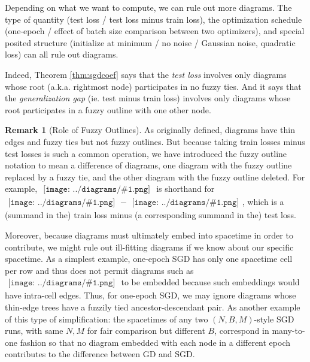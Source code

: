 \documentclass{article}
\theoremstyle{plain}
\theoremstyle{definition}
\newtheorem*{rmk*}{Remark}
\newcommand{\sdia}[1]{\begin{gathered}\texttt{[image: ../diagrams/\#1.png]}\end{gathered}}
\begin{document}
            Depending on what we want to compute, we can rule out more
            diagrams.  The type of quantity (test loss / test loss minus train
            loss), the optimization schedule (one-epoch / effect of batch
            size comparison between two optimizers), and special posited
            structure (initialize at minimum / no noise / Gaussian noise,
            quadratic loss) can all rule out diagrams.

            Indeed, Theorem \ref{thm:sgdcoef} says that the \emph{test loss}
            involves only diagrams whose root (a.k.a. rightmost node)
            participates in no fuzzy ties.  And it says that the
            \emph{generalization gap} (ie. test minus train loss) involves only
            diagrams whose root participates in a fuzzy outline with one other
            node.
            \begin{rmk*}[Role of Fuzzy Outlines]
                As originally defined, diagrams have thin edges and fuzzy ties
                but not fuzzy outlines.  But because taking train losses minus
                test losses is such a common operation, we have introduced the
                fuzzy outline notation to mean a difference of diagrams, one
                diagram with the fuzzy outline replaced by a fuzzy tie, and the
                other diagram with the fuzzy outline deleted.  For example,
                $\sdia{c(0-12)(01-12)}$ is shorthand for $\sdia{(0-12)(01-12)}
                - \sdia{(0-1-2)(01-12)}$, which is a (summand in the) train
                loss minus (a corresponding summand in the) test loss.    
            \end{rmk*}

            Moreover, because diagrams must ultimately embed into spacetime in
            order to contribute, we might rule out ill-fitting diagrams if
            we know about our specific spacetime.  As a simplest example, 
            one-epoch SGD has only one spacetime cell per row and thus does
            not permit diagrams such as $\sdia{(01-2)(01-12)}$ to be embedded
            because such embeddings would have intra-cell edges.  Thus, for
            one-epoch SGD, we may ignore diagrams whose thin-edge trees have
            a fuzzily tied ancestor-descendant pair.
            As another example of this type of simplification: the spacetimes
            of any two $(N,B,M)$-style SGD runs, with same $N, M$ for fair
            comparison but different $B$, correspond in many-to-one fashion so
            that no diagram embedded with each node in a different epoch
            contributes to the difference between GD and SGD.
\end{document}
